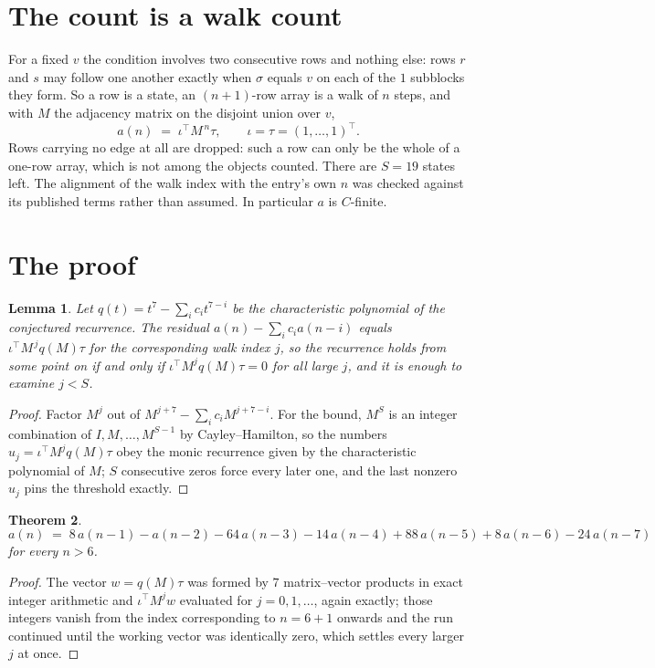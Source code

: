 \documentclass[11pt,a4paper]{article}
\theoremstyle{plain}
\newtheorem{theorem}{Theorem}
\newtheorem{lemma}[theorem]{Lemma}
\theoremstyle{definition}
\begin{document}
\section{The count is a walk count}

For a fixed $v$ the condition involves two consecutive rows and nothing
else: rows $r$ and $s$ may follow one another exactly when $\sigma$ equals $v$ on each of the
$1$ subblocks they form. So a row is a state, an $(n+1)$-row array is a walk of $n$
steps, and with $M$ the adjacency matrix on the disjoint union over $v$,
\[
a(n)\;=\;\iota^{\!\top}M^{\,n}\tau,\qquad\iota=\tau=(1,\dots,1)^{\!\top} .
\]
Rows carrying no edge at all are dropped: such a row can only be the whole of a one-row
array, which is not among the objects counted. There are $S=19$ states left.
The alignment of the walk index with the entry's own $n$ was checked against its published
terms rather than assumed. In particular $a$ is $C$-finite.

\section{The proof}

\begin{lemma}\label{lem:crit}
Let $q(t)=t^{7}-\sum_i c_it^{7-i}$ be the characteristic polynomial of the
conjectured recurrence. The residual $a(n)-\sum_ic_ia(n-i)$ equals
$\iota^{\!\top}M^{\,j}q(M)\tau$ for the corresponding walk index $j$, so the recurrence
holds from some point on if and only if $\iota^{\!\top}M^{j}q(M)\tau=0$ for all large $j$,
and it is enough to examine $j<S$.
\end{lemma}

\begin{proof}
Factor $M^{j}$ out of $M^{j+7}-\sum_ic_iM^{j+7-i}$. For the bound, $M^{S}$
is an integer combination of $I,M,\dots,M^{S-1}$ by Cayley--Hamilton, so the numbers
$u_j=\iota^{\!\top}M^{j}q(M)\tau$ obey the monic recurrence given by the characteristic
polynomial of $M$; $S$ consecutive zeros force every later one, and the last nonzero $u_j$
pins the threshold exactly.
\end{proof}

\begin{theorem}
\[
a(n)\;=\;8\,a(n-1) - a(n-2) - 64\,a(n-3) - 14\,a(n-4) + 88\,a(n-5) + 8\,a(n-6) - 24\,a(n-7)
\]
for every $n>6$.
\end{theorem}

\begin{proof}
The vector $w=q(M)\tau$ was formed by $7$ matrix--vector products in exact integer
arithmetic and $\iota^{\!\top}M^{j}w$ evaluated for $j=0,1,\dots$, again exactly; those
integers vanish from the index corresponding to $n=6+1$ onwards and the run continued
until the working vector was identically zero, which settles every larger $j$ at once.
\end{proof}
\end{document}
